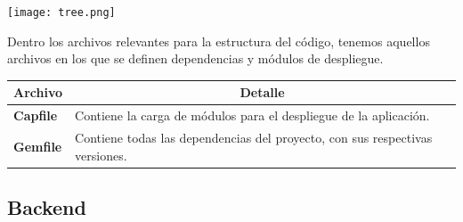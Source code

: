 \begin{center}
  \texttt{[image: tree.png]} \\
\end{center}

Dentro los archivos relevantes para la estructura del código, tenemos aquellos archivos en los que se definen dependencias y módulos de despliegue.

\begin{center}
  \begin{tabular}{ | l | p{12.5cm} |}
    \hline
    \multicolumn{1}{|c|}{\textbf{Archivo}} & \multicolumn{1}{|c|}{\textbf{Detalle}} \\
    \hline
    
    {\textbf{Capfile}} & Contiene la carga de módulos para el despliegue de la aplicación. \\ \hline
    {\textbf{Gemfile}} & Contiene todas las dependencias del proyecto, con sus respectivas versiones. \\ \hline
  \end{tabular}
\end{center}

\subsection{Backend}

